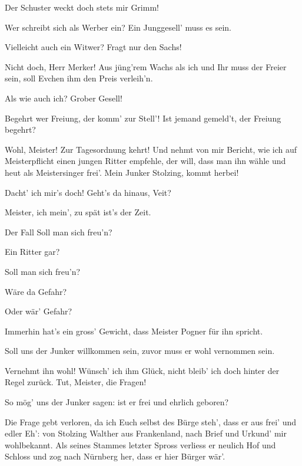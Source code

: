 \begin{drama}
\Beckmesserspeaks
Der Schuster weckt doch stets mir Grimm!

\Kothnerspeaks
Wer schreibt sich als Werber ein?
Ein Junggesell' muss es sein.

\Beckmesserspeaks
Vielleicht auch ein Witwer? Fragt nur den Sachs!

\Sachsspeaks
Nicht doch, Herr Merker! Aus jüng'rem Wachs
als ich und Ihr muss der Freier sein,
soll Evchen ihm den Preis verleih'n.

\Beckmesserspeaks
Als wie auch ich? Grober Gesell!

\Kothnerspeaks
Begehrt wer Freiung, der komm' zur Stell'!
Ist jemand gemeld't, der Freiung begehrt?

\Pognerspeaks
Wohl, Meister! Zur Tagesordnung kehrt!
Und nehmt von mir Bericht,
wie ich auf Meisterpflicht
einen jungen Ritter empfehle,
der will, dass man ihn wähle
und heut als Meistersinger frei'.
Mein Junker Stolzing, kommt herbei!



\Beckmesserspeaks


Dacht' ich mir's doch! Geht's da hinaus, Veit?


Meister, ich mein', zu spät ist's der Zeit.

Der Fall Soll man sich freu'n?

Ein Ritter gar?

\speaker{\Vogelgesang, \Moser, \Eisslinger}
Soll man sich freu'n?

\speakec{\Zorn, \Kothner, \Nachtigall, \Ortel}
Wäre da Gefahr?

\Vogelgesangspeaks
Oder wär' Gefahr?

Immerhin hat's ein gross' Gewicht,
dass Meister Pogner für ihn spricht.

\Kothnerspeaks
Soll uns der Junker willkommen sein,
zuvor muss er wohl vernommen sein.

\Pognerspeaks
Vernehmt ihn wohl! Wünsch' ich ihm Glück,
nicht bleib' ich doch hinter der Regel zurück.
Tut, Meister, die Fragen!

\Kothnerspeaks
So mög' uns der Junker sagen:
ist er frei und ehrlich geboren?

\Pognerspeaks
Die Frage gebt verloren,
da ich Euch selbst des Bürge steh',
dass er aus frei' und edler Eh':
von Stolzing Walther aus Frankenland,
nach Brief und Urkund' mir wohlbekannt.
Als seines Stammes letzter Spross
verliess er neulich Hof und Schloss
und zog nach Nürnberg her,
dass er hier Bürger wär'.


\end{drama}
